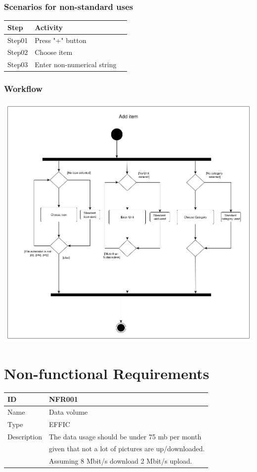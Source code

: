 \documentclass[12pt]{article}
\theoremstyle{definition}
\begin{document}
\subsubsection{Scenarios for non-standard uses}

\begin{tabular}{|l|l|l|}
\hline
Step & Activity \\ \hline
Step01 & Press "+" button \\ \hline
Step02 & Choose item \\ \hline
Step03 & Enter non-numerical string \\ \hline
\end{tabular}

\subsubsection{Workflow}

\includegraphics[scale=.5]{ActivityAddItem.png}

\pagebreak

\section{Non-functional Requirements}

\begin{flushleft}
  \begin{tabular}{|l|L{10cm}|}
  \hline
  ID & NFR001\\ \hline
  Name & Data volume \\ \hline
  Type &  EFFIC\\ \hline
  Description & The data usage should be under 75 mb per month \\
  & given that not a lot of pictures are up/downloaded. \\
  & Assuming 8 Mbit/s download 2 Mbit/s upload. \\ \hline
  \end{tabular}
\end{flushleft}
\end{document}
